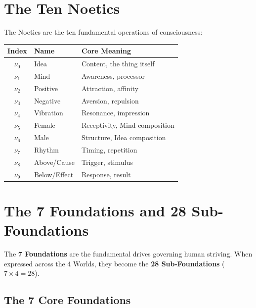 \documentclass[11pt,twoside,openright]{book}
\theoremstyle{definition}
\theoremstyle{plain}
\theoremstyle{remark}
\newcommand{\noe}[1]{\nu_{#1}}
\begin{document}
\section{The Ten Noetics}
\label{sec:ten-noetics}

The Noetics are the ten fundamental operations of consciousness:

\begin{center}
\begin{tabular}{cll}
\toprule
\textbf{Index} & \textbf{Name} & \textbf{Core Meaning} \\
\midrule
$\noe{0}$ & Idea & Content, the thing itself \\
$\noe{1}$ & Mind & Awareness, processor \\
$\noe{2}$ & Positive & Attraction, affinity \\
$\noe{3}$ & Negative & Aversion, repulsion \\
$\noe{4}$ & Vibration & Resonance, impression \\
$\noe{5}$ & Female & Receptivity, Mind composition \\
$\noe{6}$ & Male & Structure, Idea composition \\
$\noe{7}$ & Rhythm & Timing, repetition \\
$\noe{8}$ & Above/Cause & Trigger, stimulus \\
$\noe{9}$ & Below/Effect & Response, result \\
\bottomrule
\end{tabular}
\end{center}

\section{The 7 Foundations and 28 Sub-Foundations}
\label{sec:foundations}

The \textbf{7 Foundations} are the fundamental drives governing human striving. When expressed across the 4 Worlds, they become the \textbf{28 Sub-Foundations} ($7 \times 4 = 28$).

\subsection{The 7 Core Foundations}
\end{document}
